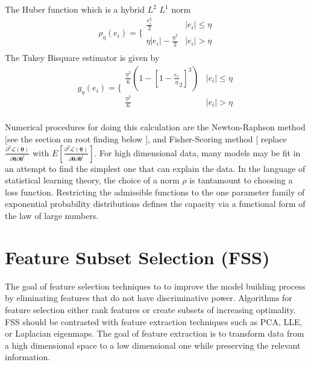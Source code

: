 The Huber function which is a hybrid $L^2$ $L^1$ norm
\begin{equation}
\rho_\eta(e_i)=\biggl\{\begin{array}{cc}
\frac{e_i^2}{2} & |e_i| \leq \eta \\
  \eta |e_i| - \frac{\eta^2}{2} & |e_i| > \eta \\
\end{array}
\end{equation}
The  Tukey Bisquare estimator is given by
\begin{equation}
g_\eta(e_i)=\biggl\{ \begin{array}{cc} \frac{\eta^2}{6} (
1-[1-\frac{e_i}{\eta}_2]^3) & |e_i| \leq \eta \\
\frac{\eta^2}{6} & |e_i| > \eta \\
\end{array}
\end{equation}

Numerical procedures for doing this calculation are the Newton-Raphson method [see the section on root finding below ], and Fisher-Scoring method [ replace $ \frac{\partial^2 \mathcal{L}(\mathbf{\theta})}{\partial \mathbf{\theta} \partial \mathbf{\theta}^{t} }$ with $E[ \frac{\partial^2 \mathcal{L}(\mathbf{\theta})}{\partial \mathbf{\theta} \partial \mathbf{\theta}^{t} }  ]$. For high dimensional data, many models may be fit in an attempt to find the simplest one that can explain the data.  In the language of statistical learning theory, the choice of a norm $\rho$ is tantamount to choosing a loss function. Restricting the admissible functions to the one parameter family of exponential probability distributions defines the capacity via a functional form of the law of large numbers. \cite{Scholkopf B. (2002)}



\section{Feature Subset Selection (FSS)}The goal of feature selection techniques to to improve the model building process by eliminating features that do not have discriminative power. Algorithms for feature selection either rank features or create subsets of increasing optimality.  FSS should be contrasted with feature extraction techniques such as PCA, LLE, or Laplacian eigenmaps.  The goal of feature extraction is to transform data from a high dimensional space to a low dimensional one while preserving the relevant information.

